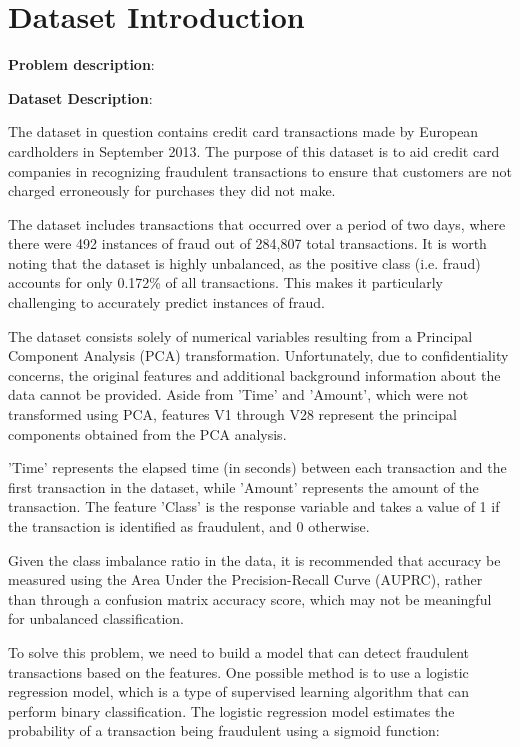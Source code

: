 
\section{Dataset Introduction}
\label{sec:intro}
\textbf{Problem description}:

\textbf{Dataset Description}:

The dataset in question contains credit card transactions made by European cardholders in September 2013. The purpose of this dataset is to aid credit card companies in recognizing fraudulent transactions to ensure that customers are not charged erroneously for purchases they did not make.

The dataset includes transactions that occurred over a period of two days, where there were 492 instances of fraud out of 284,807 total transactions. It is worth noting that the dataset is highly unbalanced, as the positive class (i.e. fraud) accounts for only 0.172\% of all transactions. This makes it particularly challenging to accurately predict instances of fraud.

The dataset consists solely of numerical variables resulting from a Principal Component Analysis (PCA) transformation. Unfortunately, due to confidentiality concerns, the original features and additional background information about the data cannot be provided. Aside from 'Time' and 'Amount', which were not transformed using PCA, features V1 through V28 represent the principal components obtained from the PCA analysis.

'Time' represents the elapsed time (in seconds) between each transaction and the first transaction in the dataset, while 'Amount' represents the amount of the transaction. The feature 'Class' is the response variable and takes a value of 1 if the transaction is identified as fraudulent, and 0 otherwise.

Given the class imbalance ratio in the data, it is recommended that accuracy be measured using the Area Under the Precision-Recall Curve (AUPRC), rather than through a confusion matrix accuracy score, which may not be meaningful for unbalanced classification.

	To solve this problem, we need to build a model that can detect fraudulent transactions based on the features. One possible method is to use a logistic regression model, which is a type of supervised learning algorithm that can perform binary classification. The logistic regression model estimates the probability of a transaction being fraudulent using a sigmoid function:
	
